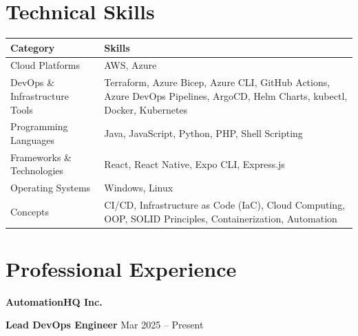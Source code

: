 \documentclass[a4paper,10pt]{article}
\begin{document}
\section*{Technical Skills}

\renewcommand{\arraystretch}{1.2}

\begin{tabularx}{\textwidth}{|p{4cm}|X|}
\hline
\textbf{Category} & \textbf{Skills} \\
\hline
Cloud Platforms & AWS, Azure \\
\hline
DevOps \& Infrastructure Tools & Terraform, Azure Bicep, Azure CLI, GitHub Actions, Azure DevOps Pipelines, ArgoCD, Helm Charts, kubectl, Docker, Kubernetes \\
\hline
Programming Languages & Java, JavaScript, Python, PHP, Shell Scripting \\
\hline
Frameworks \& Technologies & React, React Native, Expo CLI, Express.js \\
\hline
Operating Systems & Windows, Linux \\
\hline
Concepts & CI/CD, Infrastructure as Code (IaC), Cloud Computing, OOP, SOLID Principles, Containerization, Automation \\
\hline
\end{tabularx}

\section*{Professional Experience}

\textbf{AutomationHQ Inc.}

\vspace{4pt}

\textbf{Lead DevOps Engineer} \hfill Mar 2025 -- Present
\end{document}
